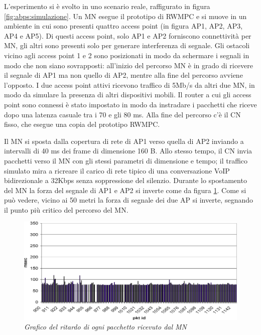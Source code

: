 \documentclass[12pt,a4paper,openright,twoside,draft]{book}
\begin{document}
L'esperimento si è svolto in uno scenario reale, raffigurato in figura
\ref{fig:abps:simulazione}. Un MN esegue il prototipo di RWMPC e si
muove in un ambiente in cui sono presenti quattro access point (in
figura AP1, AP2, AP3, AP4 e AP5). Di questi access point, solo AP1 e
AP2 forniscono connettività per MN, gli altri sono presenti solo per
generare interferenza di segnale. Gli ostacoli vicino agli access
point 1 e 2 sono posizionati in modo da schermare i segnali in modo
che non siano sovrapposti: all'inizio del percorso MN è in grado di
ricevere il segnale di AP1 ma non quello di AP2, mentre alla fine del
percorso avviene l'opposto. I due access point attivi ricevono
traffico di 5Mb/s da altri due MN, in modo da simulare la presenza di
altri dispositivi mobili. Il router a cui gli access point sono
connessi è stato impostato in modo da instradare i pacchetti che
riceve dopo una latenza casuale tra i 70 e gli 80 ms. Alla fine del
percorso c'è il CN fisso, che esegue una copia del prototipo RWMPC.

Il MN si sposta dalla copertura di rete di AP1 verso quella di AP2
inviando a intervalli di 40 ms dei frame di dimensione 160 B. Allo
stesso tempo, il CN invia pacchetti verso il MN con gli stessi
parametri di dimensione e tempo; il traffico simulato mira a ricreare
il carico di rete tipico di una conversazione VoIP bidirezionale a
32Kbps senza soppressione del silenzio. Durante lo spostamento del MN
la forza del segnale di AP1 e AP2 si inverte come da figura
\ref{fig:abps:delay-mn}. Come si può vedere, vicino ai 50 metri la
forza di segnale dei due AP si inverte, segnando il punto più critico
del percorso del MN.

\begin{figure}
  \centering
  \includegraphics[width=\textwidth]{img/abps-delay-mn}
  \caption{\em Grafico del ritardo di ogni pacchetto ricevuto dal MN}
  \label{fig:abps:delay-mn}
\end{figure}
\end{document}
